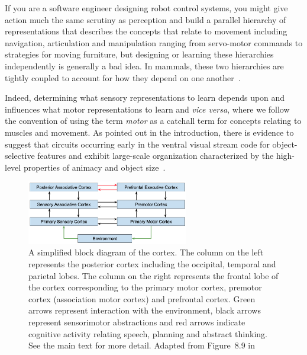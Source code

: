 \documentclass[letterpaper,11pt]{article}
\def\urlh#1{{}}
\begin{document}
If you are a software engineer designing robot control systems, you might give action much the same scrutiny as perception and build a parallel hierarchy of representations that describes the concepts that relate to movement including navigation, articulation and manipulation ranging from servo-motor commands to strategies for moving furniture, but designing or learning these hierarchies independently is generally a bad idea. In mammals, these two hierarchies are tightly coupled to account for how they depend on one another~\cite{FusterPREFRONTAL-CORTEX-15}.

Indeed, determining what sensory representations to learn depends upon and influences what motor representations to learn and {\it{vice versa}}, where we follow the convention of using the term {\it{motor}} as a catchall term for concepts relating to muscles and movement. As pointed out in the introduction, there is evidence to suggest that circuits occurring early in the ventral visual stream code for object-selective features and exhibit large-scale organization characterized by the high-level properties of animacy and object size~\cite{KonkleandCaramazzaJoN-13,LongetalPNAS-18}.


\begin{figure}
%
  \begin{center} 
    \includegraphics[width=200pt]{./figures/Coupled_Sensory_Motor_Hierarchy.jpg} %
  \end{center}
%
  \caption{A simplified block diagram of the cortex. The column on the left represents the posterior cortex including the occipital, temporal and parietal lobes. The column on the right represents the frontal lobe of the cortex corresponding to the primary motor cortex, premotor cortex (association motor cortex) and prefrontal cortex. Green arrows represent interaction with the environment, black arrows represent sensorimotor abstractions and red arrows indicate cognitive activity relating speech, planning and abstract thinking. See the main text for more detail. Adapted from Figure~8.9 in~\cite{FusterPREFRONTAL-CORTEX-15-CHAPTER_8}}
%    
  \label{fig_coupled}
%
\end{figure}
\end{document}
